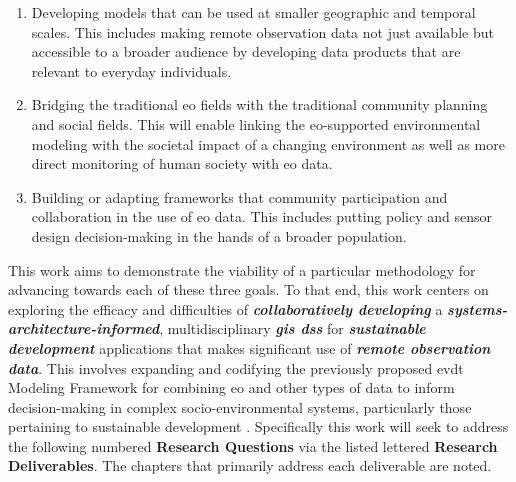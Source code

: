 \begin{enumerate}[label=\emph{\alph*},itemsep=0pt,parsep=0pt]
	\item{Developing models that can be used at smaller geographic and temporal scales. This includes making remote observation data not just available but accessible to a broader audience by developing data products that are relevant to everyday individuals.}
	\item{Bridging the traditional \ac{eo} fields with the traditional community planning and social fields. This will enable linking the \ac{eo}-supported environmental modeling with the societal impact of a changing environment as well as more direct monitoring of human society with \ac{eo} data.}
	\item{Building or adapting frameworks that community participation and collaboration in the use of \ac{eo} data. This includes putting policy and sensor design decision-making in the hands of a broader population.}
\end{enumerate}

This work aims to demonstrate the viability of a particular methodology for advancing towards each of these three goals. To that end, this work centers on exploring the efficacy and difficulties of \textbf{\textit{collaboratively developing}} a \textbf{\textit{systems-architecture-informed}}, multidisciplinary \textbf{\textit{\ac{gis} \ac{dss}}} for \textbf{\textit{sustainable development}} applications that makes significant use of \textbf{\textit{remote observation data}}. This involves expanding and codifying the previously proposed \acf{evdt} Modeling Framework  for combining \ac{eo} and other types of data to inform decision-making in complex socio-environmental systems, particularly those pertaining to sustainable development \cite{reidCombiningSocialEnvironmental2019}. Specifically this work will seek to address the following numbered \textbf{Research Questions} via the listed lettered \textbf{Research Deliverables}. The chapters that primarily address each deliverable are noted.

